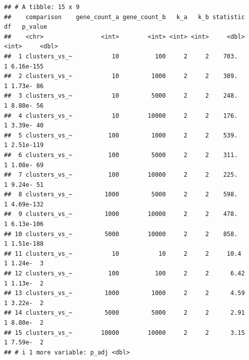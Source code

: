 \documentclass[
]{article}
\begin{document}
\begin{verbatim}
## # A tibble: 15 x 9
##    comparison    gene_count_a gene_count_b   k_a   k_b statistic    df   p_value
##    <chr>                <int>        <int> <int> <int>     <dbl> <int>     <dbl>
##  1 clusters_vs_~           10          100     2     2    703.       1 6.16e-155
##  2 clusters_vs_~           10         1000     2     2    389.       1 1.73e- 86
##  3 clusters_vs_~           10         5000     2     2    248.       1 8.80e- 56
##  4 clusters_vs_~           10        10000     2     2    176.       1 3.39e- 40
##  5 clusters_vs_~          100         1000     2     2    539.       1 2.51e-119
##  6 clusters_vs_~          100         5000     2     2    311.       1 1.08e- 69
##  7 clusters_vs_~          100        10000     2     2    225.       1 9.24e- 51
##  8 clusters_vs_~         1000         5000     2     2    598.       1 4.69e-132
##  9 clusters_vs_~         1000        10000     2     2    478.       1 6.13e-106
## 10 clusters_vs_~         5000        10000     2     2    858.       1 1.51e-188
## 11 clusters_vs_~           10           10     2     2     10.4      1 1.24e-  3
## 12 clusters_vs_~          100          100     2     2      6.42     1 1.13e-  2
## 13 clusters_vs_~         1000         1000     2     2      4.59     1 3.22e-  2
## 14 clusters_vs_~         5000         5000     2     2      2.91     1 8.80e-  2
## 15 clusters_vs_~        10000        10000     2     2      3.15     1 7.59e-  2
## # i 1 more variable: p_adj <dbl>
\end{verbatim}
\end{document}
